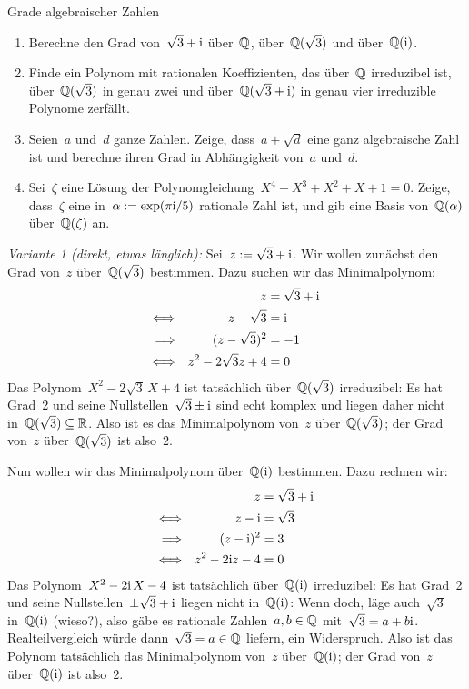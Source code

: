 \documentclass{algblatt}
\begin{document}
\begin{aufgabe}{Grade algebraischer Zahlen}
\begin{enumerate}
\item Berechne den Grad von~$\sqrt{3} + \mathrm{i}$ über~$\mathbb{Q}$, über~$\mathbb{Q}(\sqrt{3})$ und
über~$\mathbb{Q}(\mathrm{i})$.
\item Finde ein Polynom mit rationalen Koeffizienten, das über~$\mathbb{Q}$
irreduzibel ist, über~$\mathbb{Q}(\sqrt{3})$ in genau zwei und über~$\mathbb{Q}(\sqrt{3}+\mathrm{i})$
in genau vier irreduzible Polynome zerfällt.
\item Seien~$a$ und~$d$ ganze Zahlen. Zeige, dass~$a + \sqrt{d}$ eine ganz
algebraische Zahl ist und berechne ihren Grad in Abhängigkeit von~$a$ und~$d$.
\item Sei~$\zeta$ eine Lösung der Polynomgleichung~$X^4 + X^3 + X^2 + X + 1 =
0$. Zeige, dass~$\zeta$ eine in~$\alpha := \exp(\pi\mathrm{i}/5)$ rationale Zahl ist,
und gib eine Basis von~$\mathbb{Q}(\alpha)$ über~$\mathbb{Q}(\zeta)$ an.
\end{enumerate}

\begin{loesungE}
\item \emph{Variante 1 (direkt, etwas länglich):} Sei~$z := \sqrt{3} + \mathrm{i}$. Wir
wollen zunächst den Grad von~$z$ über~$\mathbb{Q}(\sqrt{3})$ bestimmen. Dazu suchen
wir das Minimalpolynom:
\begin{align*}
  && z &= \sqrt{3} + \mathrm{i} \\
  \Longleftrightarrow&& z - \sqrt{3} &= \mathrm{i} \\
  \Longrightarrow&& (z - \sqrt{3})^2 &= -1 \\
  \Longleftrightarrow&& z^2 - 2\sqrt{3}z + 4 &= 0
\end{align*}
Das Polynom~$X^2 - 2\sqrt{3}\,X + 4$ ist tatsächlich über~$\mathbb{Q}(\sqrt{3})$
irreduzibel: Es hat Grad~2 und seine Nullstellen~$\sqrt{3} \pm \mathrm{i}$ sind echt
komplex und liegen daher nicht in~$\mathbb{Q}(\sqrt{3}) \subseteq \mathbb{R}$. Also ist es
das Minimalpolynom von~$z$ über~$\mathbb{Q}(\sqrt{3})$; der Grad von~$z$
über~$\mathbb{Q}(\sqrt{3})$ ist also~$2$.

Nun wollen wir das Minimalpolynom über~$\mathbb{Q}(\mathrm{i})$ bestimmen. Dazu rechnen wir:
\begin{align*}
  && z &= \sqrt{3} + \mathrm{i} \\
  \Longleftrightarrow&& z - \mathrm{i} &= \sqrt{3} \\
  \Longrightarrow&& (z - \mathrm{i})^2 &= 3 \\
  \Longleftrightarrow&& z^2 - 2\mathrm{i} z - 4 &= 0
\end{align*}
Das Polynom~$X^2 - 2\mathrm{i}\,X - 4$ ist tatsächlich über~$\mathbb{Q}(\mathrm{i})$
irreduzibel: Es hat Grad~2 und seine Nullstellen~$\pm\sqrt{3} + \mathrm{i}$ liegen
nicht in~$\mathbb{Q}(\mathrm{i})$: Wenn doch, läge auch~$\sqrt{3}$ in~$\mathbb{Q}(\mathrm{i})$ (wieso?), also
gäbe es rationale Zahlen~$a, b \in \mathbb{Q}$ mit~$\sqrt{3} = a + b \mathrm{i}$.
Realteilvergleich würde dann~$\sqrt{3} = a \in \mathbb{Q}$ liefern, ein Widerspruch.
Also ist das Polynom tatsächlich das Minimalpolynom von~$z$ über~$\mathbb{Q}(\mathrm{i})$; der
Grad von~$z$ über~$\mathbb{Q}(\mathrm{i})$ ist also~$2$.


\end{loesungE}
\end{aufgabe}
\end{document}

